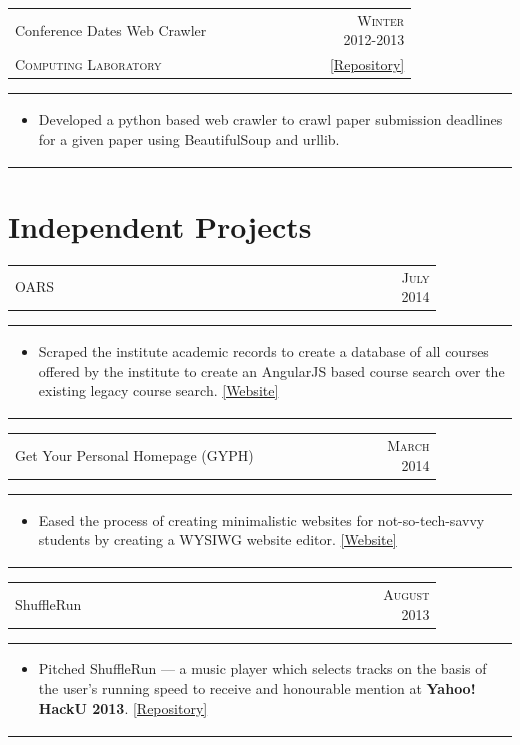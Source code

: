 \documentclass[a4paper,10pt]{article} %
\newcommand{\cproject}[5]{
    \begin{tabular}{p{0.80\linewidth}r}
        \textcolor{NavyBlue}{#2} & \multicolumn{1}{m{4cm}}{\raggedleft \textsc{#1}}\\
        #3 & #4
    \end{tabular}
    \begin{tabular}{p{\linewidth}}
    \vspace{-0.3cm}
        \footnotesize{#5}
    \end{tabular}
    \vspace{-0.5cm}
}
\newcommand{\iproject}[3]{
    \begin{tabular}{p{0.85\linewidth}r}
        \textcolor{NavyBlue}{#2} & \multicolumn{1}{m{3cm}}{\raggedleft \textsc{#1}}\\
    \end{tabular}
    \begin{tabular}{p{\linewidth}}
    \vspace{-0.3cm}
        \footnotesize{#3}
    \end{tabular}
    \vspace{-0.5cm}
}
\begin{document}
\cproject
    {Winter 2012-2013}
    {Conference Dates Web Crawler}
    {\textsc{Computing Laboratory}}
    {\href{https://github.com/srijanshetty/crawler} {\footnotesize{ [Repository]}} }
    {
      \begin{itemize}[leftmargin=0.5cm]
           \item Developed a python based web crawler to crawl paper submission deadlines for a given paper using BeautifulSoup and
               urllib.
      \end{itemize}

    }

\section{Independent Projects}

\iproject {July 2014}
          {OARS}
          {
               \begin{itemize}[leftmargin=0.5cm]
                   \item Scraped the institute academic records to create a database of all courses offered by the institute to create an
                       AngularJS based course search over the existing legacy course search.  \href{https://navya.github.io/oars}{[Website]}
               \end{itemize}
           }

\iproject {March 2014}
          {Get Your Personal Homepage (GYPH)}
          {
               \begin{itemize}[leftmargin=0.5cm]
                   \item Eased the process of creating minimalistic websites for not-so-tech-savvy students by creating a WYSIWG website
                       editor.  \href{http://gyph2.herokuapp.com/} {[Website]}
               \end{itemize}
           }

\iproject {August 2013}
          {ShuffleRun}
          {
              \begin{itemize}[leftmargin=0.5cm]
                  \item Pitched ShuffleRun --- a music player which selects tracks on the basis of the user's running speed to receive
                      and honourable mention at \textbf{Yahoo! HackU 2013}.  \href{https://github.com/srijanshetty/ShuffleRun} {[Repository]}
              \end{itemize}
          }
\end{document}
